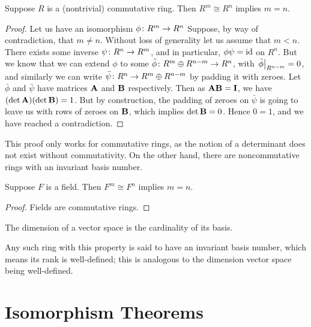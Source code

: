 \begin{theorem}
    Suppose \(R\) is a (nontrivial) commutative ring.
    Then \(R^m \cong R^n\) implies \(m = n\).
\end{theorem}
\begin{proof}
    Let us have an isomorphism \(\phi\colon R^m\to R^n\)
    Suppose, by way of contradiction, that \(m \neq n\).
    Without loss of generality let us assume that \(m < n\).
    There exists some inverse \(\psi\colon R^n\to R^m\),
    and in particular, \(\phi\psi = \operatorname{id}\) on \(R^n\).
    But we know that we can extend \(\phi\) to some \(\bar{\phi}\colon R^m \oplus R^{n-m}\to R^n\),
    with \(\eval{\bar{\phi}}_{R^{n-m}} = 0\),
    and similarly we can write \(\bar{\psi}\colon R^n\to R^m \oplus R^{n-m}\)
    by padding it with zeroes.
    Let \(\bar{\phi}\) and \(\bar{\psi}\) have matrices \(\vb{A}\) and \(\vb{B}\) respectively.
    Then as \(\vb{A}\vb{B} = \vb{I}\), we have \((\det\vb{A})(\det\vb{B}) = 1\).
    But by construction, the padding of zeroes on \(\bar{\psi}\)
    is going to leave us with rows of zeroes on \(\vb{B}\),
    which implies \(\det\vb{B} = 0\).
    Hence \(0 = 1\), and we have reached a contradiction.
\end{proof}
\begin{remark}
    This proof only works for commutative rings,
    as the notion of a determinant does not exist without commutativity.
    On the other hand, there are noncommutative rings with an invariant basis number.
\end{remark}
\begin{corollary}
    Suppose \(F\) is a field.
    Then \(F^m \cong F^n\) implies \(m = n\).
\end{corollary}
\begin{proof}
    Fields are commutative rings.
\end{proof}
\begin{definition}
    The dimension of a vector space is the cardinality of its basis.
\end{definition}
\begin{remark}
    Any such ring with this property is said to have an invariant basis number,
    which means its rank is well-defined;
    this is analogous to the dimension vector space being well-defined.
\end{remark}


\section{Isomorphism Theorems}

